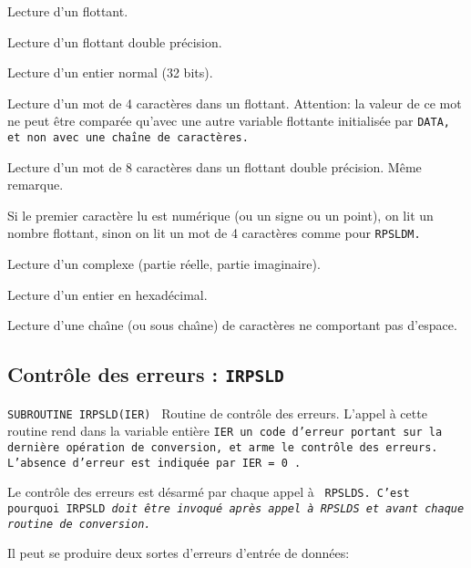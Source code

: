 \documentclass[a4paper,12pt,titlepage]{article}
\newcommand{\darg}[1]{\item[\tt #1\rm]}
\newcommand{\fsub}[1]{\hbox {\tt SUBROUTINE #1  } \medskip }
\newenvironment{argdesc}{\begin{list}{-}{\leftmargin 8em \labelwidth 7em}}%
{\end{list}}
\begin{document}
\begin{argdesc}
\darg{RPSLDE(X) :}
                   Lecture d'un flottant.

\darg{RPSLDD(D) :}
                   Lecture d'un flottant double pr\'ecision.

\darg{RPSLDI(I) :}
                   Lecture   d'un  entier  normal  (32  bits).

\darg{RPSLDM(V) :}
                   Lecture  d'un  mot  de  4  caract\`eres  dans  un 
                   flottant.  Attention\rm :   la  valeur de ce mot  ne 
                   peut  \^etre compar\'ee qu'avec une autre  variable 
                   flottante initialis\'ee par \tt DATA\rm, et non avec une 
                   cha\^{\i}ne de caract\`eres.

\darg{RPSLDL(W) :}
                   Lecture  d'un  mot  de  8  caract\`eres  dans  un 
                   flottant double pr\'ecision. M\^eme remarque.

\darg{RPSLDX(X) :}
                   Si le premier caract\`ere lu est num\'erique (ou un 
                   signe ou un point),  on lit un nombre flottant, 
                   sinon on lit un mot de 4 caract\`eres comme  pour 
                   \tt RPSLDM\rm.

\darg{RPSLDC(C) :}
                   Lecture  d'un complexe (partie  r\'eelle,  partie 
                   imaginaire).

\darg{RPSLDZ(I) :}
                   Lecture d'un entier en hexad\'ecimal.

\darg{RPSLDT(T) :} Lecture d'une cha\^{\i}ne (ou sous cha\^{\i}ne) de
		   caract\`eres ne comportant pas d'es\-pa\-ce.
\end{argdesc}

\subsection{Contr\^ole des erreurs : \tt IRPSLD}
\fsub{   IRPSLD(IER)} 
   Routine de contr\^ole des erreurs. L'appel \`a cette routine rend dans la
variable enti\`ere \tt IER\rm\ un code d'erreur portant sur la derni\`ere
op\'eration de conversion, et arme le contr\^ole des erreurs. L'absence
d'erreur est indiqu\'ee par \tt IER\rm\ = 0 .

   Le contr\^ole des erreurs est d\'esarm\'e par chaque appel \`a \tt
RPSLDS\rm. C'est pourquoi \tt IRPSLD\rm\ \em doit \^etre invoqu\'e apr\`es
appel \`a \em
\tt RPSLDS\rm\ \em et avant chaque routine de conversion\em.

  Il peut se produire deux sortes d'erreurs d'entr\'ee de donn\'ees:
\end{document}
